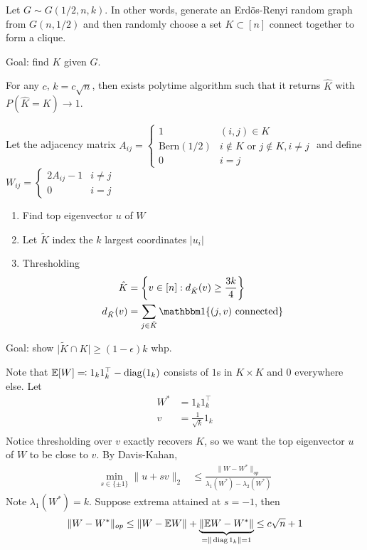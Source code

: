 \begin{example}
    Let $G \sim G(1/2, n, k)$. In other words,
    generate an Erd\"os-Renyi random graph from $G(n, 1/2)$ and then
    randomly choose a set $K \subset [n]$ connect together to form a clique.
    
    Goal: find $K$ given $G$.
    
    \begin{theorem}
      For any $c$, $k = c \sqrt{n}$, then exists polytime algorithm such that
      it returns $\hat{K}$ with $P(\hat{K} = K) \to 1$.
    \end{theorem}
    
    Let the adjacency matrix $A_{ij} = \begin{cases}
        1 & (i,j) \in K \\
        \text{Bern}(1/2) & i \not\in K\text{ or }j \not\in K, i \neq j \\
        0 & i = j
    \end{cases}$ and define $W_{ij} = \begin{cases}
        2 A_{ij} - 1 & i \neq j \\
        0 & i = j
    \end{cases}$
    
    \begin{enumerate}
        \item Find top eigenvector $u$ of $W$
        \item Let $\tilde{K}$ index the $k$ largest coordinates $\lvert u_i \rvert$
        \item  Thresholding
        \begin{align}
            \hat{K} &= \left\{v \in [n] : d_{\tilde{K}}(v) \geq \frac{3k}{4} \right\} \\
            d_{\tilde{K}}(v) &= \sum_{j \in \tilde{K}} \ind\{(j,v) \text{ connected}\}
        \end{align}
    \end{enumerate}
    
    
    Goal: show $\lvert \tilde{K} \cap K \rvert \geq (1 - \epsilon) k$ whp.
    
    Note that $\mathbb{E}[W] \eqqcolon 1_k 1_k^\top - \operatorname{diag}(1_k)$ consists of $1$s in $K \times K$
    and $0$ everywhere else. Let
    \begin{align}
        W^* &= 1_k 1_k^\top \\
        v &= \frac{1}{\sqrt{k}} 1_k \\
    \end{align}
    Notice thresholding over $v$ exactly recovers $K$, so we want the top
    eigenvector $u$ of $W$ to be close to $v$. By Davis-Kahan,
    \begin{align}
        \min_{s \in \{\pm 1\}} \|u + s v\|_2
        &\leq \frac{\|W - W^*\|_{op}}{\lambda_1(W^*) - \lambda_2(W^*)}
    \end{align}
    Note $\lambda_1(W^*) = k$.
    Suppose extrema attained at $s=-1$, then
    \begin{align}
        \|W - W^*\|_{op} 
        \leq \|W - \mathbb{E} W\| + \underbrace{\|\mathbb{E} W - W^*\|}_{=\|\operatorname{diag} 1_k\| = 1}
        \leq c \sqrt{n} + 1
    \end{align}
    

\end{example}
